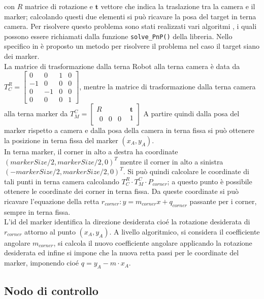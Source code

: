   con $R$ matrice di rotazione e $ \boldsymbol{t}$ vettore che indica la traslazione tra la camera e il marker; calcolando questi due elementi si può ricavare la 
  posa del target in terna camera. Per risolvere questo problema sono stati realizzati vari algoritmi \cite{marchand2015pose}, i quali possono essere richiamati dalla 
  funzione \texttt{solve\_PnP()} della libreria. Nello specifico in \cite{infinitesimal} è proposto un metodo per risolvere il problema nel caso il target siano dei
  marker. \\
  La matrice di trasformazione dalla terna Robot alla terna camera è data da   $ T^R_C = \begin{bmatrix} 0 & 0 & 1 & 0 \\ -1 & 0 & 0 & 0 \\ 0 & -1 & 0 & 0 \\ 0 & 0 & 0 & 1 \end{bmatrix} $, mentre la matrice di trasformazione dalla terna camera alla terna marker da $ T^C_M = \begin{bmatrix} R & \boldsymbol{t} \\ \begin{matrix} 0 & 0  & 0 \end{matrix} & 1 \end{bmatrix} $
  A partire quindi dalla posa del marker rispetto a camera e dalla posa della camera in terna fissa si può ottenere la posizione in terna fissa del marker $(x_A, y_A)$.\\
  In terna marker, il corner in alto a destra ha coordinate $(markerSize/2, markerSize/2, 0)^T$ mentre il corner in alto a sinistra $(-markerSize/2, markerSize/2, 0)^T$.
  Si può quindi calcolare le coordinate di tali punti in terna camera calcolando $T^R_C \cdot T^C_M \cdot P_{corner}$; a questo punto è possibile ottenere le coordinate
  dei corner in terna fissa. Da queste coordinate si può ricavare l'equazione della retta $r_{corner}: y = m_{corner} x + q_{corner}$ passante per i corner, sempre in 
  terna fissa. \\
  L'id del marker identifica la direzione desiderata cioé la rotazione desiderata di $r_{corner}$ attorno al punto $(x_A, y_A)$. A livello algoritmico, si considera
  il coefficiente angolare $m_{corner}$, si calcola il nuovo coefficiente angolare applicando la rotazione desiderata ed infine si impone che la nuova retta 
  passi per le coordinate del marker, imponendo cioé $q = y_A - m \cdot x_A$.
  
\subsection{Nodo di controllo}
